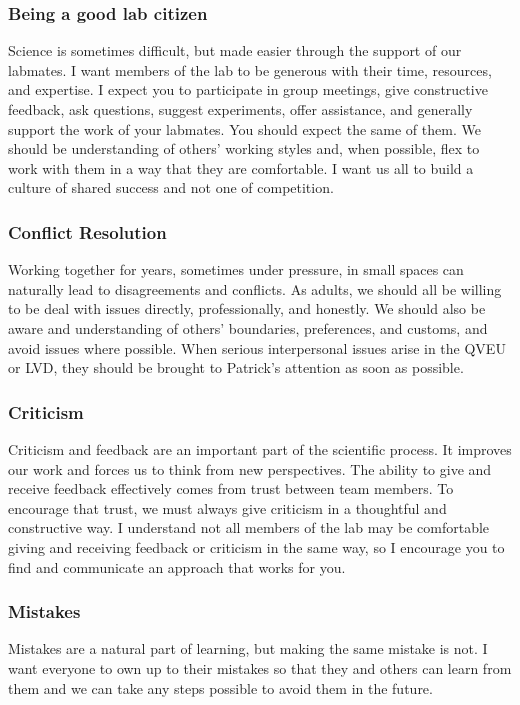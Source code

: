\documentclass[10pt, a4paper, twocolumn]{article} %
\begin{document}
\subsubsection{Being a good lab citizen}
Science is sometimes difficult, but made easier through the support of our labmates. I want members of the lab to be generous with their time, resources, and expertise. I expect you to participate in group meetings, give constructive feedback, ask questions, suggest experiments, offer assistance, and generally support the work of your labmates. You should expect the same of them. We should be understanding of others' working styles and, when possible, flex to work with them in a way that they are comfortable. I want us all to build a culture of shared success and not one of competition.

\subsubsection{Conflict Resolution}
Working together for years, sometimes under pressure, in small spaces can naturally lead to disagreements and conflicts. As adults, we should all be willing to be deal with issues directly, professionally, and honestly. We should also be aware and understanding of others' boundaries, preferences, and customs, and avoid issues where possible. When serious interpersonal issues arise in the QVEU or LVD, they should be brought to Patrick's attention as soon as possible.

\subsubsection{Criticism}
Criticism and feedback are an important part of the scientific process. It improves our work and forces us to think from new perspectives. The ability to give and receive feedback effectively comes from trust between team members. To encourage that trust, we must always give criticism in a thoughtful and constructive way. I understand not all members of the lab may be comfortable giving and receiving feedback or criticism in the same way, so I encourage you to find and communicate an approach that works for you.

\subsubsection{Mistakes}
Mistakes are a natural part of learning, but making the same mistake is not. I want everyone to own up to their mistakes so that they and others can learn from them and we can take any steps possible to avoid them in the future.
\end{document}
